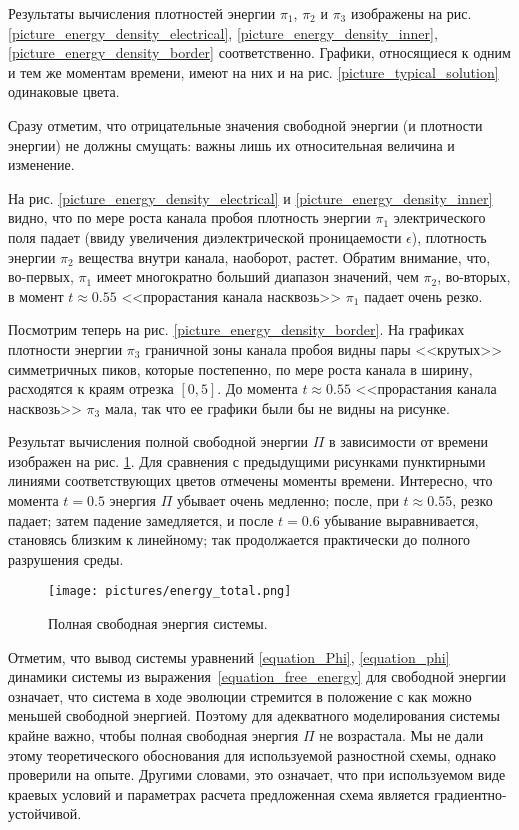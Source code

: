 \documentclass[a4paper,12pt]{article}
\theoremstyle{plain}
\theoremstyle{definition}
\begin{document}
Результаты вычисления плотностей энергии $\pi_1$, $\pi_2$ и $\pi_3$ изображены на рис. \ref{picture_energy_density_electrical}, \ref{picture_energy_density_inner}, \ref{picture_energy_density_border} соответственно. Графики, относящиеся к одним и тем же моментам времени, имеют на них и на рис. \ref{picture_typical_solution} одинаковые цвета.

Сразу отметим, что отрицательные значения свободной энергии (и плотности энергии) не должны смущать: важны лишь их относительная величина и изменение.

На рис. \ref{picture_energy_density_electrical} и \ref{picture_energy_density_inner} видно, что по мере роста канала пробоя плотность энергии $\pi_1$ электрического поля падает (ввиду увеличения диэлектрической проницаемости $\epsilon$), плотность энергии $\pi_2$ вещества внутри канала, наоборот, растет. Обратим внимание, что, во-первых, $\pi_1$ имеет многократно больший диапазон значений, чем $\pi_2$, во-вторых, в момент $t \approx 0.55$ <<прорастания канала насквозь>> $\pi_1$ падает очень резко.

Посмотрим теперь на рис. \ref{picture_energy_density_border}. На графиках плотности энергии $\pi_3$ граничной зоны канала пробоя видны пары <<крутых>> симметричных пиков, которые постепенно, по мере роста канала в ширину, расходятся к краям отрезка $[0, 5]$. До момента $t \approx 0.55$ <<прорастания канала насквозь>> $\pi_3$ мала, так что ее графики были бы не видны на рисунке.

Результат вычисления полной свободной энергии $\Pi$ в зависимости от времени изображен на рис. \ref{picture_energy_total}. Для сравнения с предыдущими рисунками пунктирными линиями соответствующих цветов отмечены моменты времени. Интересно, что момента $t = 0.5$ энергия $\Pi$ убывает очень медленно; после, при $t \approx 0.55$, резко падает; затем падение замедляется, и после $t = 0.6$ убывание выравнивается, становясь близким к линейному; так продолжается практически до полного разрушения среды.

\begin{figure}
    \centering
    \texttt{[image: pictures/energy\_total.png]}
    \vspace{-0.5cm}
    \caption{Полная свободная энергия системы.}
    \label{picture_energy_total}
\end{figure}

Отметим, что вывод системы уравнений \eqref{equation_Phi}, \eqref{equation_phi} динамики системы из выражения~\eqref{equation_free_energy} для свободной энергии означает, что система в ходе эволюции стремится в положение с как можно меньшей свободной энергией. Поэтому для адекватного моделирования системы крайне важно, чтобы полная свободная энергия $\Pi$ не возрастала. Мы не дали этому теоретического обоснования для используемой разностной схемы, однако проверили на опыте. Другими словами, это означает, что при используемом виде краевых условий и параметрах расчета предложенная схема является градиентно-устойчивой.
\end{document}
